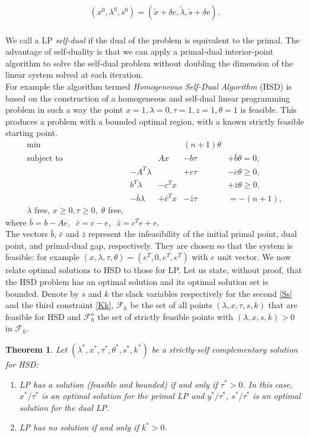 \documentclass[a4paper,10 pt,titlepage,twoside]{book}
\theoremstyle{plain}
\newtheorem{thm}{Theorem}[chapter]
\theoremstyle{definition}
\theoremstyle{remark}
\begin{document}
\begin{align*}
(x^{0}, \lambda^{0}, s^{0}) = (\tilde{x}+\delta e,\tilde{\lambda},\tilde{s}+\delta e).
\end{align*}
\\
We call a LP \textit{self-dual} if the dual of the problem is equivalent to the primal. The advantage of self-duality is that we can apply a primal-dual interior-point algorithm to solve the self-dual problem without doubling the dimension of the linear system solved at each iteration.\\
For example the algorithm termed \textit{Homogeneous Self-Dual Algorithm} (HSD) is based on the construction of a homogeneous and self-dual linear programming problem in such a way the point $x=1, \lambda = 0, \tau= 1,z=1,\theta= 1$ is feasible. This produces a problem with a bounded optimal
region, with a known strictly feasible starting point.
\begin{equation*}
\begin{alignat*}{4}
\min&&&(n+1)\theta&\\
\text{subject to}&&Ax&-b\tau&+\bar{b}\theta=0,\\
&-A^{T}\lambda&&+c\tau&-\bar{c}\theta\geq0,\\\label{Ss}
&b^{T}\lambda&-c^{T}x&&+\bar{z}\theta\geq0,\\\label{Kk}
&-\bar{b}\lambda&+\bar{c}^{T}x&-\bar{z}\tau&=-(n+1),\\
\lambda\text{ free, }x \geq 0,\tau\geq0, \;\theta \text{ free,} 
\end{alignat*}
\end{equation*}
where  $\bar{b} = b -Ae,\;\; \bar{c}=c-e,\;\;\bar{z}=c^{T}e+e$.\\
The vectors $\bar{b}$, $\bar{c}$ and $\bar{z}$ represent the infeasibility of the initial primal point, dual
point, and primal-dual gap, respectively. They are chosen so that the system is
feasible: for example $(x,\lambda, \tau,\theta)=(e^{T},0,e^{T},e^{T})$ with $e$ unit vector. We now relate optimal solutions to HSD to those for LP. Let us state, without proof, that the HSD problem has an optimal solution and its optimal solution set is bounded. \cite{LNP}
Denote by $s$ and $k$ the slack variables respectively for the second \ref{Ss} and the third constraint \ref{Kk}, $\mathcal{F}_{h}$ be the set of all points $(\lambda, x, \tau, s, k)$ that are feasible for HSD and $\mathcal{F}_{h}^{o}$ the set of strictly feasible points with $(\lambda,x,s,k)>0$ in $\mathcal{F}_{h}$.  
\begin{thm}
	Let $(\lambda^{*},x^{*},\tau^{*},\theta^{*},s^{*},k^{*})$ be a strictly-self complementary solution for HSD:
	\begin{enumerate}
		\item LP has a solution (feasible and bounded) if and only if $\tau^{*}>0$. In this case, $x^{*}/\tau^{*}$ is an optimal solution for the primal LP and $y^{*}/\tau^{*}$, $s^{*}/\tau^{*}$ is an optimal solution for the dual LP.
		\item LP has no solution if and only if $k^{*}>0$.
	\end{enumerate} 
\end{thm}
\end{document}
